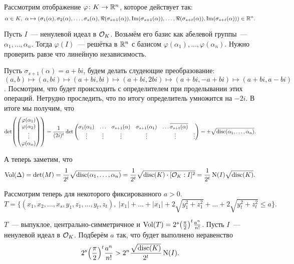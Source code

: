 	Рассмотрим отображение $\varphi\colon K \to \mathbb{R}^n$, которое действует так:
	\[
		\alpha \in K, \ \alpha \mapsto (\sigma_1(\alpha), \sigma_2(\alpha), \ldots, \sigma_s(\alpha), \Re(\sigma_{s + 1}(\alpha)), \mathop{\mathrm{Im}}\nolimits(\sigma_{s + 1}(\alpha)),  \ldots, \Re(\sigma_{s + t}(\alpha)), \mathop{\mathrm{Im}}\nolimits(\sigma_{s + t}(\alpha))) \in \mathbb{R}^n.
	\]
	\hypertarget{phi_from_this}{}

	Пусть $I$~--- ненулевой идеал в $\mathcal{O}_{K}$. Возьмём его базис как абелевой группы~--- $\alpha_1, \ldots, \alpha_n$. Тогда $\varphi(I)$~--- решётка в $\mathbb{R}^n$ с базисом $\varphi(\alpha_1), \ldots, \varphi(\alpha_n)$. Нужно проверить равзе что линейную независимость. 

	Пусть $\sigma_{s + 1}(\alpha) = a + bi$, будем делать слудеющие преобразование: $(a, b) \mapsto (a, bi) \mapsto (a + bi, bi) \mapsto (a + bi, 2bi) \mapsto (a + bi, -a + bi) \mapsto (a + bi, a - bi)$. Посмотрим, что будет происходить с определителем при проделывании этих операций. Нетрудно проследить, что по итогу определитель умножится на $-2i$. В итоге мы получим, что 
	\[
		\det\lr*{\begin{pmatrix} \varphi(\alpha_1) \\ \varphi(\alpha_2) \\ \vdots \\ \varphi(\alpha_n) \end{pmatrix}} = \frac{1}{(2i)^t} \det{\begin{pmatrix} \sigma_{1}(\alpha_1) & \ldots& \sigma_{s + 1}(\alpha) & \sigma_{s + 1}(\alpha_1) & \ldots \overline{\sigma_{s + t}(\alpha)} \\ \vdots & \vdots & \vdots & \vdots & \vdots & \vdots\end{pmatrix}} = \pm \sqrt{\disc(\alpha_1, \ldots, \alpha_n)}.
	\]

	А теперь заметим, что 
	\[
		\operatorname{Vol}(\Delta) = \det(M)
 = \frac{1}{2^t} \sqrt{\operatorname{disc}(\alpha_1, \ldots, \alpha_n)} = \frac{1}{2^t} \sqrt{\operatorname{disc}(K) \cdot [\mathcal{O}_{K} : I]^2} = \frac{1}{2^t} \operatorname{\mathrm{N}}(I) \sqrt{\operatorname{disc}(K)}.	\]

 	Рассмотрим теперь для некоторого фиксированного $a > 0$.
 	\[
 		T = \{ (x_1, x_2, \ldots, x_{s}, y_{1}, z_{1}, \ldots, y_{t}, z_{t}), \ |x_1| + \ldots + |x_1| + 2\sqrt{y_1^2 + z_1^2} + \ldots + 2\sqrt{y_t^2 + z_t^2} \le a \}. 
 	\]

 	$T$~--- выпуклое, центрально-симметричное и $\Vol(T) = 2^s \lr*{\frac{\pi}{2}}^t \frac{a^n}{n!}$.
 	Пусть $I$~--- ненулевой идеал в $\mathcal{O}_{K}$. Подберём $a$ так, что будет выполнено неравенство 
 	\begin{equation}
 		2^s \lr*{\frac{\pi}{2}}^t \frac{a^n}{n!} > 2^n \frac{\sqrt{\disc(K)}}{2^t} \Nm(I). \label{calculating_a}
 	\end{equation}


